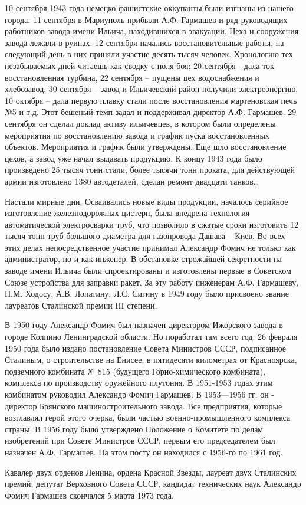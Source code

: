 10 сентября 1943 года немецко-фашистские оккупанты были изгнаны из нашего
города. 11 сентября в Мариуполь прибыли А.Ф. Гармашев и ряд руководящих
работников завода имени Ильича, находившихся в эвакуации. Цеха и сооружения
завода лежали в руинах. 12 сентября начались восстановительные работы, на
следующий день в них приняли участие десять тысяч человек. Хронологию тех
незабываемых дней читаешь как сводку с поля боя: 20 сентября - дала ток
восстановленная турбина, 22 сентября – пущены цех водоснабжения и хлебозавод,
30 сентября – завод и Ильичевский район получили электроэнергию, 10 октября –
дала первую плавку стали после восстановления мартеновская печь №5 и т.д. Этот
бешеный  темп задал и поддерживал директор А.Ф. Гармашев. 29 сентября он сделал
доклад активу ильичевцев, в котором были определены мероприятия по
восстановлению завода и график пуска восстановленных объектов. Мероприятия и
график были утверждены. Еще шло восстановление цехов, а завод уже начал
выдавать продукцию. К концу 1943 года  было произведено 25 тысяч тонн стали,
более тысячи тонн проката, для  действующей армии изготовлено 1380 автодеталей,
сделан ремонт двадцати танков…

Настали мирные дни. Осваивались новые виды продукции, началось серийное
изготовление железнодорожных цистерн, была внедрена технология автоматической
электросварки труб, что позволило в сжатые сроки  изготовить 12 тысяч тонн труб
большого диаметра для газопровода Дашава – Киев. Во всех этих делах
непосредственное участие принимал Александр Фомич не только как администратор,
но и как инженер. В обстановке строжайшей секретности на заводе имени Ильича
были спроектированы и изготовлены первые в Советском Союзе устройства для
заправки ракет. За эту работу инженерам А.Ф. Гармашеву, П.М. Ходосу, А.В.
Лопатину, Л.С. Сигину в 1949 году было присвоено звание лауреатов Сталинской
премии ΙΙΙ степени. 

В 1950 году Александр Фомич был назначен директором Ижорского завода в городе
Колпино Ленинградской области. Но поработал там всего год. 26 февраля 1950 года
было издано постановление Совета Министров СССР, подписанное Сталиным, о
строительстве на Енисее, в пятидесяти километрах от Красноярска, подземного
комбината № 815 (будущего Горно-химического комбината), комплекса по
производству оружейного плутония. В 1951-1953 годах этим комбинатом руководил
Александр Фомич Гармашев. В 1953—1956 гг. он - директор Брянского
машиностроительного завода. Все предприятия, которые возглавлял герой этого
очерка, были частью военно-промышленного комплекса страны. В 1956 году было
утверждено Положение о Комитете по делам изобретений при Совете Министров СССР,
первым его председателем был назначен А.Ф. Гармашев. На этом посту он находился
с 1956-го по 1961 год.

Кавалер двух орденов Ленина, ордена Красной Звезды, лауреат двух Сталинских
премий, депутат Верховного Совета СССР, кандидат технических наук Александр
Фомич Гармашев скончался 5 марта 1973 года.
